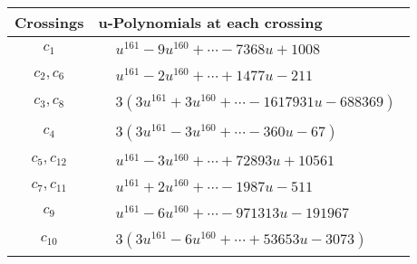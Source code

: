 \documentclass[1p]{elsarticle_modified}
\theoremstyle{definition}
\begin{document}
\begin{tabular}{m{50pt}|m{274pt}}
Crossings & \hspace{64pt}u-Polynomials at each crossing \\
\hline $$\begin{aligned}c_{1}\end{aligned}$$&$\begin{aligned}
&u^{161}-9 u^{160}+\cdots-7368 u+1008
\end{aligned}$\\
\hline $$\begin{aligned}c_{2},c_{6}\end{aligned}$$&$\begin{aligned}
&u^{161}-2 u^{160}+\cdots+1477 u-211
\end{aligned}$\\
\hline $$\begin{aligned}c_{3},c_{8}\end{aligned}$$&$\begin{aligned}
&3(3 u^{161}+3 u^{160}+\cdots-1617931 u-688369)
\end{aligned}$\\
\hline $$\begin{aligned}c_{4}\end{aligned}$$&$\begin{aligned}
&3(3 u^{161}-3 u^{160}+\cdots-360 u-67)
\end{aligned}$\\
\hline $$\begin{aligned}c_{5},c_{12}\end{aligned}$$&$\begin{aligned}
&u^{161}-3 u^{160}+\cdots+72893 u+10561
\end{aligned}$\\
\hline $$\begin{aligned}c_{7},c_{11}\end{aligned}$$&$\begin{aligned}
&u^{161}+2 u^{160}+\cdots-1987 u-511
\end{aligned}$\\
\hline $$\begin{aligned}c_{9}\end{aligned}$$&$\begin{aligned}
&u^{161}-6 u^{160}+\cdots-971313 u-191967
\end{aligned}$\\
\hline $$\begin{aligned}c_{10}\end{aligned}$$&$\begin{aligned}
&3(3 u^{161}-6 u^{160}+\cdots+53653 u-3073)
\end{aligned}$\\
\hline
\end{tabular}\\~\\
\end{document}

